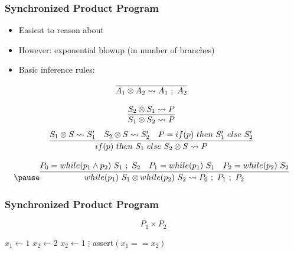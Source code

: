 \documentclass{beamer} %
\theoremstyle{definition} %
\newcommand{\cross}{\otimes{}}
\begin{document}
\begin{frame}
    \frametitle{Synchronized Product Program}
    
       \begin{itemize}
           \item Easiest to reason about
           \item However: exponential blowup (in number of branches)
           \pause
           \item Basic inference rules:
       \end{itemize}

    
        \[
            \begin{array}{c}
                \infer[]{A_1 \cross A_2 \leadsto A_1\ ;\ A_2}{} \\ \\
                \infer[]{S_1 \cross S_2 \leadsto P}{
                    S_2 \cross S_1 \leadsto P
                } 
            \end{array}
        \]
        \pause
        \[
            \begin{array}{c}
                \infer[]{if(p)\ then\ S_1\ else\ S_2 \cross S \leadsto P}{
                    \text{$S_1 \cross S \leadsto S_1'$} &
                    \text{$S_2 \cross S \leadsto S_2'$} &
                    \text{$P = if(p)\ then\ S_1'\ else\ S_2'$}
                } \\ \\
                \pause
                \infer[]{while(p_1)\ S_1 \cross while(p_2)\ S_2 \leadsto P_0\ ;\ P_1\ ;\ P_2}{
                    \text{$P_0 = while(p_1 \land p_2)\ S_1\ ;\ S_2$} &
                    \text{$P_1 = while(p_1)\ S_1$} &
                    \text{$P_2 = while(p_2)\ S_2$}
                }
            \end{array}
        \]
        
    \end{frame}

    \begin{frame}
        \frametitle{Synchronized Product Program}
        $$P_1 \times P_2$$
        \begin{center}
            \begin{minipage}{0.5\linewidth}
            
            \begin{algorithm}[H]
                \begin{algorithmic}
                        \State $x_1 \gets 1$
                            \State $x_2 \gets 2$
                        \Else
                            \State $x_2 \gets 1$
                        \EndIf
                    \Else
                        \State $\vdots$
                    \EndIf
                    \State \textsf{assert}$(x_1 == x_2)$
                \end{algorithmic}
            \end{algorithm}
        \end{minipage}
        \end{center}
        
    \end{frame}
\end{document}
